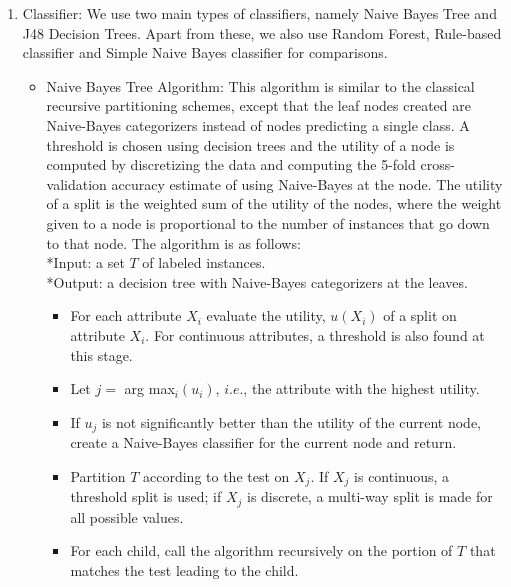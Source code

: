 \begin{itemize}
\begin{enumerate}
\item{Classifier: We use two main types of classifiers, namely Naive Bayes Tree and J48 Decision Trees. Apart from these, we also use Random Forest, Rule-based classifier and Simple Naive Bayes classifier for comparisons.}
\begin{itemize}
\item{Naive Bayes Tree Algorithm: This algorithm is similar to the classical recursive partitioning schemes, except that the leaf nodes created are Naive-Bayes categorizers instead of nodes predicting a single class. A threshold is chosen using decision trees and the utility of a node is computed by discretizing the data and computing the 5-fold cross-validation accuracy estimate of using Naive-Bayes at the node. The utility of a split is the weighted sum of the utility of the nodes, where the weight given to a node is proportional to the number of instances that go down to that node. The algorithm is as follows:}
\vspace{2.5 mm}
\\*Input: a set $T$ of labeled instances.
\\*Output: a decision tree with Naive-Bayes categorizers at the leaves.
\vspace{0.1 mm}
\begin{itemize}
\item{For each attribute $X_{i}$ evaluate the utility, $u(X_{i})$ of a split on attribute $X_{i}$. For continuous attributes, a threshold is also found at this stage.}
\item{Let $j = $ arg max$_{i}$$(u_{i})$, $i.e.$, the attribute with the highest utility.}
\item{If $u_{j}$ is not significantly better than the utility of the current node, create a Naive-Bayes classifier for the current node and return.}
\item{Partition $T$ according to the test on $X_{j}$. If $X_{j}$ is continuous, a threshold split is used; if $X_{j}$ is discrete, a multi-way split is made for all possible values.}
\item{For each child, call the algorithm recursively on the portion of $T$ that matches the test leading to the child.}
\end{itemize}


\end{itemize}
\end{enumerate}
\end{itemize}

